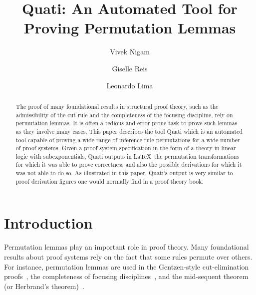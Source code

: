 \documentclass{llncs}
\title{Quati: An Automated Tool for Proving Permutation Lemmas}
\author{Vivek Nigam\inst{1} \and Giselle Reis\inst{2} \and Leonardo Lima\inst{1}}
\institute{Universidade Federal da Para\'{i}ba, Brazil
\and Technische Universit\"{a}t Wien, Austria
}
\begin{document}
\maketitle

\begin{abstract}
The proof of many foundational results in structural proof theory, such as the
admissibility of the cut rule and the completeness of the focusing discipline,
rely on permutation lemmas. It is often a tedious and error prone task to prove
such lemmas as they involve many cases. This paper describes the tool Quati
which is an automated tool capable of proving a wide range of inference rule
permutations for a wide number of proof systems. Given a proof system
specification in the form of a theory in linear logic with subexponentials,
Quati outputs in \LaTeX\ the permutation transformations for which it was able
to prove correctness and also the 
possible derivations for which it was not able to do so. As illustrated in this
paper, Quati's output is very similar to proof derivation figures one would
normally find in a proof theory book. 
\end{abstract}

\section{Introduction}

Permutation lemmas play an important role in proof theory. Many foundational
results about proof systems rely on the fact that some rules
permute over others. For instance, permutation lemmas are used in the Gentzen-style 
cut-elimination proofs~\cite{gentzen}, the completeness of focusing disciplines~\cite{andreoli,miller}, 
and the mid-sequent theorem (or Herbrand's theorem)~\cite{herbrand}.
\end{document}
